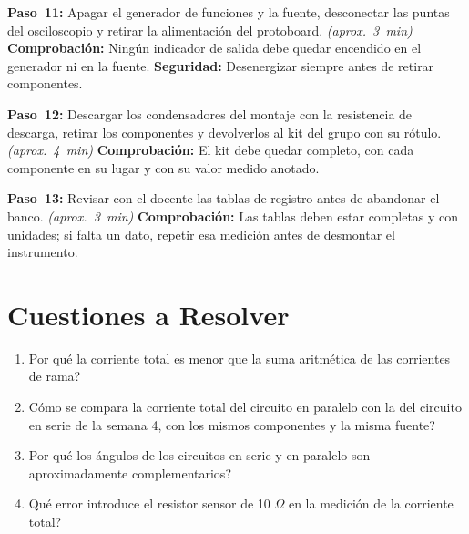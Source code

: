 \documentclass[12pt]{article}
\begin{document}
\begin{pasos}
  \item \textbf{Paso~11:} Apagar el generador de funciones y la fuente, desconectar las puntas del osciloscopio y retirar la alimentación del protoboard. \emph{(aprox.~\SI{3}{\minute})} \textbf{Comprobación:} Ningún indicador de salida debe quedar encendido en el generador ni en la fuente. \textbf{Seguridad:} Desenergizar siempre antes de retirar componentes.
  \item \textbf{Paso~12:} Descargar los condensadores del montaje con la resistencia de descarga, retirar los componentes y devolverlos al kit del grupo con su rótulo. \emph{(aprox.~\SI{4}{\minute})} \textbf{Comprobación:} El kit debe quedar completo, con cada componente en su lugar y con su valor medido anotado.
  \item \textbf{Paso~13:} Revisar con el docente las tablas de registro antes de abandonar el banco. \emph{(aprox.~\SI{3}{\minute})} \textbf{Comprobación:} Las tablas deben estar completas y con unidades; si falta un dato, repetir esa medición antes de desmontar el instrumento.
\end{pasos}

\section{Cuestiones a Resolver}\label{sec:cuestiones}
\begin{enumerate}
  \item \textquestiondown{}Por qué la corriente total es menor que la suma aritmética de las corrientes de rama?
  \item \textquestiondown{}Cómo se compara la corriente total del circuito en paralelo con la del circuito en serie de la semana 4, con los mismos componentes y la misma fuente?
  \item \textquestiondown{}Por qué los ángulos de los circuitos en serie y en paralelo son aproximadamente complementarios?
  \item \textquestiondown{}Qué error introduce el resistor sensor de 10 \ensuremath{\Omega} en la medición de la corriente total?
\end{enumerate}

\end{document}
